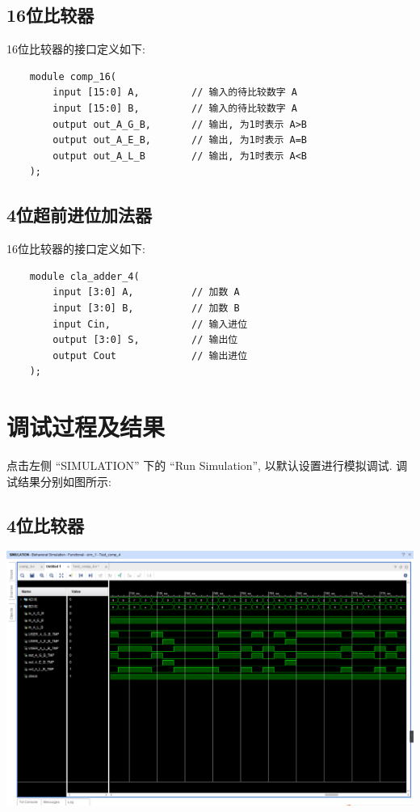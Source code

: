 \documentclass{article}
\begin{document}
\subsection{16位比较器}

16位比较器的接口定义如下:
\begin{lstlisting}
    module comp_16(
        input [15:0] A,         // 输入的待比较数字 A
        input [15:0] B,         // 输入的待比较数字 A
        output out_A_G_B,       // 输出, 为1时表示 A>B
        output out_A_E_B,       // 输出, 为1时表示 A=B
        output out_A_L_B        // 输出, 为1时表示 A<B
    );
\end{lstlisting}

\subsection{4位超前进位加法器}

16位比较器的接口定义如下:
\begin{lstlisting}
    module cla_adder_4(
        input [3:0] A,          // 加数 A
        input [3:0] B,          // 加数 B
        input Cin,              // 输入进位
        output [3:0] S,         // 输出位
        output Cout             // 输出进位
    );
\end{lstlisting}


\section{调试过程及结果}

点击左侧 ``SIMULATION'' 下的 ``Run Simulation'', 以默认设置进行模拟调试. 调试结果分别如图所示:

\subsection{4位比较器}

\begin{center}
    \includegraphics[width=500pt]{assets/image_comp_4.png}
\end{center}
\end{document}
